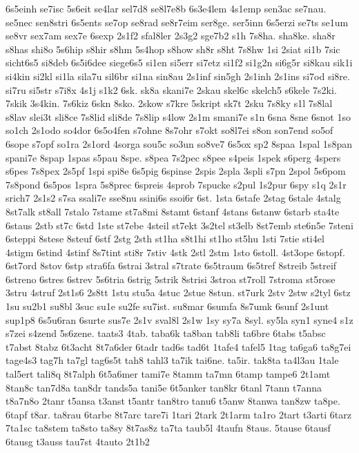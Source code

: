 {6s5einh
se7isc
5s6eit
se4lar
sel7d8
se8l7e8b
6s3e4lem
4s1emp
sen3ac
se7nau.
se5nec
sen8stri
6s5ents
se7op
se8rad
se8r7eim
ser8ge.
ser5inn
6s5erzi
se7ts
se1um
se8vr
sex7am
sex7e
6sexp
2s1f2
sfal8ler
2s3g2
sge7b2
s1h
7s8ha.
sha8ke.
sha8r
s8has
shi8o
5s6hip
s8hir
s8hm
5s4hop
s8how
sh8r
s8ht
7s8hw
1si
2siat
si1b
7sic
sicht6s5
si8deb
6s5i6dee
siege6s5
si1en
si5err
si7etz
si1f2
si1g2n
si6g5r
si8kau
sik1i
si4kin
si2kl
si1la
sila7u
sil6br
si1na
sin8au
2s1inf
sin5gh
2s1inh
2s1ins
si7od
si8re.
si7ru
si5str
s7i8x
4s1j
s1k2
6sk.
sk8a
skani7e
2skau
skel6c
skelch5
s6kele
7s2ki.
7skik
3s4kin.
7s6kiz
6skn
8sko.
2skow
s7kre
5skript
sk7t
2sku
7s8ky
s1l
7s8lal
s8lav
slei3t
sli8ce
7s8lid
sli8de
7s8lip
s4low
2s1m
smani7e
s1n
6sna
8sne
6snot
1so
so1ch
2s1odo
so4dor
6s5o4fen
s7ohne
8s7ohr
s7okt
so8l7ei
s8on
son7end
so5of
6sope
s7opf
so1ra
2s1ord
4sorga
sou5c
so3un
so8ve7
6s5ox
sp2
8spaa
1spal
1s8pan
spani7e
8spap
1spas
s5pau
8spe.
s8pea
7s2pec
s8pee
s4peis
1spek
s6perg
4spers
s6pes
7s8pex
2s5pf
1spi
spi8e
6s5pig
6spinse
2spis
2spla
3spli
s7pn
2spol
5s6pom
7s8pond
6s5pos
1spra
5s8prec
6spreis
4sprob
7spucke
s2pul
1s2pur
6spy
s1q
2s1r
srich7
2s1s2
s7sa
ssali7e
sse8nu
ssini6s
ssoi6r
6st.
1sta
6stafe
2stag
6stale
4stalg
8st7alk
st8all
7stalo
7stame
st7a8mi
8stamt
6stanf
4stans
6stanw
6starb
sta4te
6staus
2stb
st7c
6std
1ste
st7ebe
4steil
st7ekt
3s2tel
st3elb
8st7emb
ste6n5e
7steni
6steppi
8stese
8steuf
6stf
2stg
2sth
st1ha
s8t1hi
st1ho
st5hu
1sti
7stie
sti4el
4stigm
6stind
4stinf
8s7tint
sti8r
7stiv
4stk
2stl
2stm
1sto
6stoll.
4st3ope
6stopf.
6st7ord
8stov
6stp
stra6fa
6strai
3stral
s7trate
6s5traum
6s5tref
8streib
5streif
6streno
6stres
6strev
5s6tria
6strig
5strik
8strisi
3stroa
st7roll
7stroma
st5rose
3stru
4struf
2st1s6
2s8tt
1stu
stu5a
4stuc
2stue
8stun.
st7urk
2stv
2stw
s2tyl
6stz
1su
su2b1
su8bl
3suc
su1e
su2fe
su7ist.
su8mar
6sumfa
8s7umk
6sunf
2s1unt
sup1p8
6s5u6ran
6surte
sus7e
2s1v
sval8l
2s1w
1sy
sy7a
8syl.
sy5la
syn1
syne4
s1z
s7zei
s4zend
5s6zene.
taats3
4tab.
taba6k
ta8ban
tab8li
ta6bre
6tabs
t5absc
t7abst
8tabz
6t3acht
8t7a6der
6tadr
tad6s
tad6t
1tafe4
tafel5
1tag
ta6ga6
ta8g7ei
tage4s3
tag7h
ta7gl
tag6s5t
tah8
tahl3
ta7ik
tai6ne.
ta5ir.
tak8ta
ta4l3au
1tale
tal5ert
tali8q
8t7alph
6t5a6mer
tami7e
8tamm
ta7mn
6tamp
tampe6
2t1amt
8tan8c
tan7d8a
tan8dr
tands5a
tani5e
6t5anker
tan8kr
6tanl
7tann
t7anna
t8a7n8o
2tanr
t5ansa
t3anst
t5antr
tan8tro
tanu6
t5anw
8tanwa
tan8zw
ta8pe.
6tapf
t8ar.
ta8rau
6tarbe
8t7arc
tare7i
1tari
2tark
2t1arm
ta1ro
2tart
t3arti
6tarz
7ta1sc
ta8stem
ta8sto
ta8sy
8t7as8z
ta7ta
taub5l
4taufn
8taus.
5tause
6tausf
6tausg
t3auss
tau7st
4tauto
2t1b2
}
